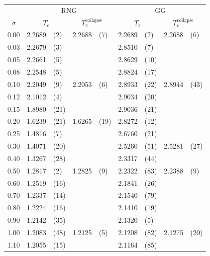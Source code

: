     \begin{table}[htb]
        \center
        \begin{tabular}{l l@{}l l@{}l l@{}l l@{}l}
            \toprule
             & \multicolumn{4}{c}{RNG} & \multicolumn{4}{c}{GG}\\
            \cmidrule(rl){2-5} \cmidrule(rl){6-9}
            \multicolumn{1}{c}{\(\sigma\)} & \multicolumn{2}{c}{\(T_c\)} & \multicolumn{2}{c}{\(T_c^{\mathrm{collapse}}\)} & \multicolumn{2}{c}{\(T_c\)} & \multicolumn{2}{c}{\(T_c^{\mathrm{collapse}}\)}\\
            \midrule
            0.00 & 2.2689& (2)& 2.2688&(7) & 2.2689& (2) & 2.2688&(6) \\
            0.03 & 2.2679& (3)&       &    & 2.8510& (7) &       &    \\
            0.05 & 2.2661& (5)&       &    & 2.8629&(10) &       &    \\
            0.08 & 2.2548& (5)&       &    & 2.8824&(17) &       &    \\
            0.10 & 2.2049& (9)& 2.2053&(6) & 2.8933&(22) & 2.8944&(43)\\
            0.12 & 2.1012& (4)&       &    & 2.9034&(20) &       &    \\
            0.15 & 1.8980&(21)&       &    & 2.9036&(21) &       &    \\
            0.20 & 1.6239&(21)& 1.6265&(19)& 2.8272&(12) &       &    \\
            0.25 & 1.4816& (7)&       &    & 2.6760&(21) &       &    \\
            0.30 & 1.4071&(20)&       &    & 2.5260&(51) & 2.5281&(27)\\
            0.40 & 1.3267&(28)&       &    & 2.3317&(44) &       &    \\
            0.50 & 1.2817& (2)& 1.2825&(9) & 2.2322&(83) & 2.2388&(9) \\
            0.60 & 1.2519&(16)&       &    & 2.1841&(26) &       &    \\
            0.70 & 1.2337&(14)&       &    & 2.1540&(79) &       &    \\
            0.80 & 1.2224&(16)&       &    & 2.1410&(19) &       &    \\
            0.90 & 1.2142&(35)&       &    & 2.1320& (5) &       &    \\
            1.00 & 1.2083&(48)& 1.2125&(5) & 2.1208&(82) & 2.1275&(20)\\
            1.10 & 1.2055&(15)&       &    & 2.1164&(85) &       &    \\

\end{tabular}
\end{table}
